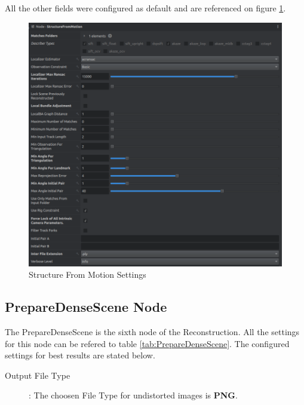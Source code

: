 \documentclass[12pt]{report}
\begin{document}
All the other fields were configured as default and are referenced on figure \ref{fig:SFM_set tings}.
\begin{figure}[H]%
  \centering
 \includegraphics[width=1\textwidth]{SFM_settings.png}
\caption{Structure From Motion Settings}
\label{fig:SFM_set tings} 
\end{figure}








\newpage
\subsection*{PrepareDenseScene Node}
The PrepareDenseScene is the sixth node of the Reconstruction.  All the settings for this node can be refered to table \ref{tab:PrepareDenseScene}.
The configured settings for best results are stated below. 

\begin{description}
  \item[Output File Type]: The choosen File Type for undistorted images is \textbf{PNG}.
\end{description}
\end{document}
